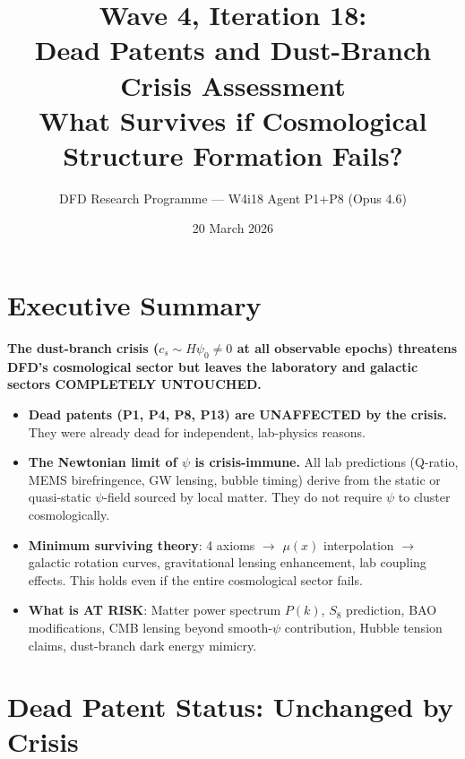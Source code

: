 \documentclass[11pt]{article}
\title{\textbf{Wave 4, Iteration 18:}\\
\textbf{Dead Patents and Dust-Branch Crisis Assessment}\\[6pt]
{\large What Survives if Cosmological Structure Formation Fails?}}
\author{DFD Research Programme --- W4i18 Agent P1+P8 (Opus 4.6)}
\date{20 March 2026}
\begin{document}
\maketitle

\section*{Executive Summary}

\begin{tcolorbox}[colback=red!5!white, colframe=red!70!black,
  title=\textbf{W4i18 TOP FINDING: CRISIS TRIAGE}]

\textbf{The dust-branch crisis ($c_s \sim H\psi_0 \neq 0$ at all observable
epochs) threatens DFD's cosmological sector but leaves the laboratory and
galactic sectors COMPLETELY UNTOUCHED.}

\begin{itemize}
\item \textbf{Dead patents (P1, P4, P8, P13) are UNAFFECTED by the crisis.}
  They were already dead for independent, lab-physics reasons.
\item \textbf{The Newtonian limit of $\psi$ is crisis-immune.} All lab
  predictions (Q-ratio, MEMS birefringence, GW lensing, bubble timing)
  derive from the static or quasi-static $\psi$-field sourced by local
  matter. They do not require $\psi$ to cluster cosmologically.
\item \textbf{Minimum surviving theory}: 4 axioms $\to$ $\mu(x)$ interpolation
  $\to$ galactic rotation curves, gravitational lensing enhancement, lab
  coupling effects. This holds even if the entire cosmological sector fails.
\item \textbf{What is AT RISK}: Matter power spectrum $P(k)$, $S_8$ prediction,
  BAO modifications, CMB lensing beyond smooth-$\psi$ contribution, Hubble
  tension claims, dust-branch dark energy mimicry.
\end{itemize}
\end{tcolorbox}

\section{Dead Patent Status: Unchanged by Crisis}
\end{document}
